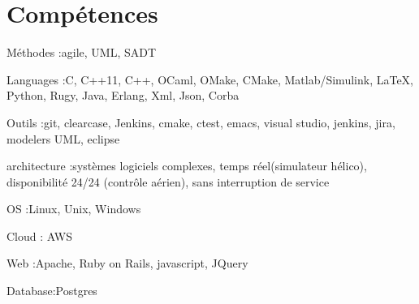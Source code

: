 \section{Compétences}

\begin{itemize}

\myitem
{Méthodes :}{agile, UML, SADT}

\myitem
{Languages :}{C, C++11, C++, OCaml, OMake, CMake, Matlab/Simulink, LaTeX, Python, Rugy, Java, Erlang, Xml, Json, Corba}

\myitem
{Outils :}{git, clearcase, Jenkins, cmake, ctest, emacs, visual studio, jenkins, jira, modelers UML, eclipse}

\myitem
{architecture :}{systèmes logiciels complexes, temps réel(simulateur hélico), disponibilité 24/24 (contrôle aérien), sans interruption de service}

\myitem
{OS :}{Linux, Unix, Windows}

\myitem
{Cloud} : {AWS}

\myitem 
{Web :}{Apache, Ruby on Rails, javascript, JQuery}

\myitem 
{Database:}{Postgres}

\end{itemize}
